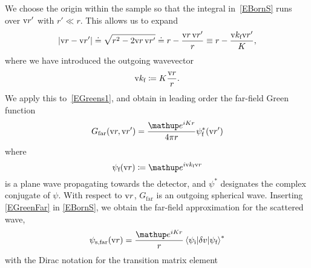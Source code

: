 We choose the origin within the sample
so that the integral in~\cref{EBornS} runs over $\text{v}{r}'$ with $r'\ll r$.
This allows us to expand
\begin{equation}
  \left|\text{v}{r}-\text{v}{r}'\right|
  \doteq \sqrt{r^2-2\text{v}{r}\,\text{v}{r}'}
  \doteq r - \frac{\text{v}{r}\,\text{v}{r}'}{r}
  \equiv r - \frac{\text{v}{k}_{\text{f}} \text{v}{r}'}{K},
\end{equation}
%
%
where we have introduced the outgoing wavevector
\begin{equation}
  \text{v}{k}_{\text{f}}\coloneqq K\frac{\text{v}{r}}{r}.
\end{equation}
We apply this to~\cref{EGreens1},
%
and obtain in leading order the far-field Green function
\begin{equation}\label{EGreenFar}
  G_\text{far}(\r,\r')
  = \frac{\e^{iKr}}{4\pi r}\psi^*_\sf(\r')
\end{equation}
%
where
\begin{equation}\label{EPsisfar}
  \psi_\sf(\r) \coloneqq  \e^{i\k_\sf \r}
\end{equation}
%
is a plane wave propagating towards the detector,
and $\psi^*$ designates the complex conjugate of $\psi$.
With respect to $\text{v}{r}$, $G_\text{far}$ is an outgoing spherical wave.
Inserting \cref{EGreenFar} in \cref{EBornS},
we obtain the far-field approximation for the scattered wave,
%
\begin{equation}\label{EsandwichC}
  \psi_\text{s,far}(\r)
  = \frac{\e^{iKr}}{r}
    \bra \psi_\si|\delta v|\psi_\sf\ket^*
\end{equation}
%
with the Dirac notation for the transition matrix element
%
%

